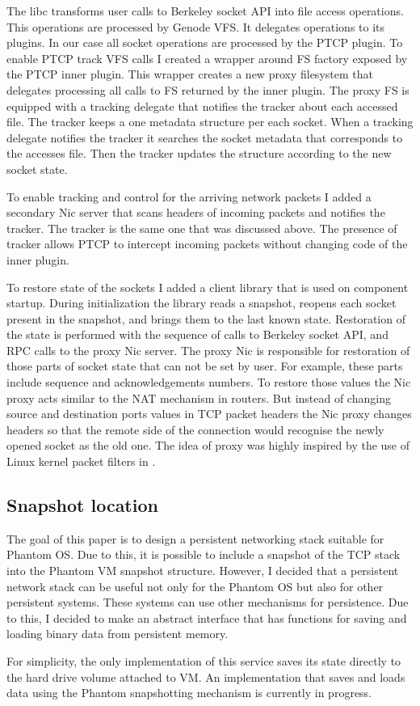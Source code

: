 The libc transforms user calls to Berkeley socket API into file access
operations. This operations are processed by Genode VFS. It delegates
operations to its plugins. In our case all socket operations are processed by
the PTCP plugin. To enable PTCP track VFS calls I created a wrapper around
FS factory exposed by the PTCP inner plugin. This wrapper creates a new
proxy filesystem that delegates processing all calls to FS returned by the
inner plugin. The proxy FS is equipped with a tracking delegate that notifies
the tracker about each accessed file. The tracker keeps a one metadata
structure per each socket. When a tracking delegate notifies the tracker it
searches the socket metadata that corresponds to the accesses file. Then the
tracker updates the structure according to the new socket state.

To enable tracking and control for the arriving network packets I added a
secondary Nic server that scans headers of incoming packets and notifies the
tracker. The tracker is the same one that was discussed above. The presence of
tracker allows PTCP to intercept incoming packets without changing code of the
inner plugin. 

To restore state of the sockets I added a client library that is used on
component startup. During initialization the library reads a snapshot, reopens
each socket present in the snapshot, and brings them to the last known state.
Restoration of the state is performed with the sequence of calls to Berkeley
socket API, and RPC calls to the proxy Nic server. The proxy Nic is responsible
for restoration of those parts of socket state that can not be set by user. For
example, these parts include sequence and acknowledgements numbers. To restore
those values the Nic proxy acts similar to the NAT mechanism in routers. But 
instead of changing source and destination ports values in TCP packet headers
the Nic proxy changes headers so that the remote side of the connection would
recognise the newly opened socket as the old one. The idea of proxy was highly
inspired by the use of Linux kernel packet filters in \cite{rocks_racks}.


\subsection{Snapshot location}

The goal of this paper is to design a persistent networking stack suitable for
Phantom OS. Due to this, it is possible to include a snapshot of the TCP stack
into the Phantom VM snapshot structure. However, I decided that a persistent
network stack can be useful not only for the Phantom OS but also for other
persistent systems. These systems can use other mechanisms for persistence. Due
to this, I decided to make an abstract interface that has functions for saving
and loading binary data from persistent memory.

For simplicity, the only implementation of this service saves its state
directly to the hard drive volume attached to VM. An implementation that saves
and loads data using the Phantom snapshotting mechanism is currently in
progress.

